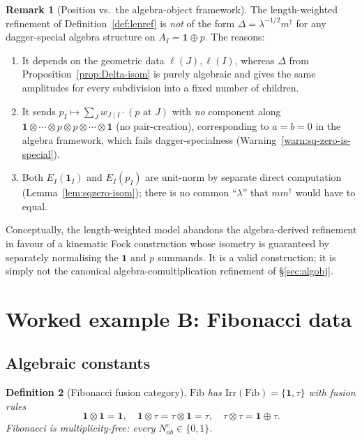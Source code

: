 \documentclass[11pt,a4paper]{article}
\newtheorem{definition}{Definition}[section]
\theoremstyle{definition}
\newtheorem{remark}[definition]{Remark}
\newcommand{\Irr}{\mathrm{Irr}}
\newcommand{\Fib}{\mathrm{Fib}}
\newcommand{\one}{\mathbf{1}}
\begin{document}
\begin{remark}[Position vs.\ the algebra-object framework]\label{rem:sqzero-vs-alg}
The length-weighted refinement of Definition~\ref{def:lenref} is
\emph{not} of the form $\Delta = \lambda^{-1/2}m^{\dagger}$ for any
dagger-special algebra structure on $A_I=\one\oplus p$. The reasons:
\begin{enumerate}[label=(\roman*)]
\item It depends on the geometric data $\ell(J),\ell(I)$, whereas
      $\Delta$ from Proposition~\ref{prop:Delta-isom} is purely algebraic
      and gives the same amplitudes for every subdivision into a fixed
      number of children.
\item It sends $p_I \mapsto \sum_J w_{J\mid I}\cdot(\text{$p$ at $J$})$
      with \emph{no} component along $\one\otimes\cdots\otimes p\otimes p\otimes\cdots\otimes\one$
      (no pair-creation), corresponding to $a=b=0$ in the algebra
      framework, which fails dagger-specialness
      (Warning~\ref{warn:sq-zero-is-special}).
\item Both $E_I(\one_I)$ and $E_I(p_I)$ are unit-norm by separate direct
      computation (Lemma~\ref{lem:sqzero-isom}); there is no common
      ``$\lambda$'' that $mm^{\dagger}$ would have to equal.
\end{enumerate}
Conceptually, the length-weighted model abandons the algebra-derived
refinement in favour of a kinematic Fock construction whose isometry is
guaranteed by separately normalising the $\one$ and $p$ summands. It is a
valid construction; it is simply not the canonical
algebra-comultiplication refinement of \S\ref{sec:algobj}.
\end{remark}

\section{Worked example B: Fibonacci data}\label{sec:fib-data}

\subsection{Algebraic constants}

\begin{definition}[Fibonacci fusion category]\label{def:fib}
$\Fib$ has $\Irr(\Fib) = \{\one,\tau\}$ with fusion rules
\[
\one\otimes\one = \one, \quad
\one\otimes\tau = \tau\otimes\one = \tau, \quad
\tau\otimes\tau = \one\oplus\tau.
\]
Fibonacci is multiplicity-free: every $N_{ab}^{c}\in\{0,1\}$.
\end{definition}
\end{document}
